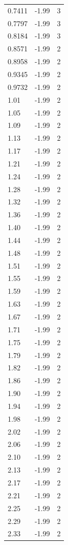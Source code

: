 \begin{longtable}{lrr}
  0.7411 & -1.99 & 3 \\
  0.7797 & -1.99 & 3 \\
  0.8184 & -1.99 & 3 \\
  0.8571 & -1.99 & 2 \\
  0.8958 & -1.99 & 2 \\
  0.9345 & -1.99 & 2 \\
  0.9732 & -1.99 & 2 \\
  1.01 & -1.99 & 2 \\
  1.05 & -1.99 & 2 \\
  1.09 & -1.99 & 2 \\
  1.13 & -1.99 & 2 \\
  1.17 & -1.99 & 2 \\
  1.21 & -1.99 & 2 \\
  1.24 & -1.99 & 2 \\
  1.28 & -1.99 & 2 \\
  1.32 & -1.99 & 2 \\
  1.36 & -1.99 & 2 \\
  1.40 & -1.99 & 2 \\
  1.44 & -1.99 & 2 \\
  1.48 & -1.99 & 2 \\
  1.51 & -1.99 & 2 \\
  1.55 & -1.99 & 2 \\
  1.59 & -1.99 & 2 \\
  1.63 & -1.99 & 2 \\
  1.67 & -1.99 & 2 \\
  1.71 & -1.99 & 2 \\
  1.75 & -1.99 & 2 \\
  1.79 & -1.99 & 2 \\
  1.82 & -1.99 & 2 \\
  1.86 & -1.99 & 2 \\
  1.90 & -1.99 & 2 \\
  1.94 & -1.99 & 2 \\
  1.98 & -1.99 & 2 \\
  2.02 & -1.99 & 2 \\
  2.06 & -1.99 & 2 \\
  2.10 & -1.99 & 2 \\
  2.13 & -1.99 & 2 \\
  2.17 & -1.99 & 2 \\
  2.21 & -1.99 & 2 \\
  2.25 & -1.99 & 2 \\
  2.29 & -1.99 & 2 \\
  2.33 & -1.99 & 2 \\

\end{longtable}
